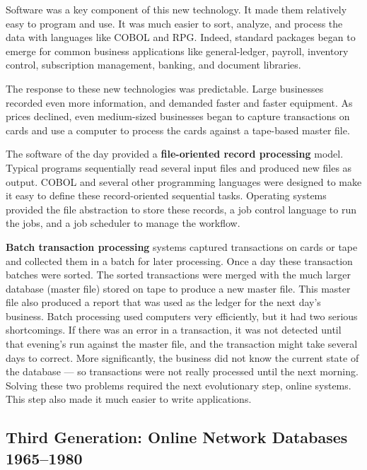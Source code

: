 \documentclass[a4paper,12pt,notitlepage,twoside,openright]{article}
\begin{document}
Software was a key component of this new technology. It made them
relatively easy to program and use. It was much easier to sort, analyze,
and process the data with languages like COBOL and RPG. Indeed, standard
packages began to emerge for common business applications like
general-ledger, payroll, inventory control, subscription management,
banking, and document libraries.

The response to these new technologies was predictable. Large businesses
recorded even more information, and demanded faster and faster
equipment. As prices declined, even medium-sized businesses began to
capture transactions on cards and use a computer to process the cards
against a tape-based master file.

The software of the day provided a \textbf{file-oriented record
processing} model. Typical programs sequentially read several input
files and produced new files as output. COBOL and several other
programming languages were designed to make it easy to define these
record-oriented sequential tasks. Operating systems provided the file
abstraction to store these records, a job control language to run the
jobs, and a job scheduler to manage the workflow.

\textbf{Batch transaction processing} systems captured transactions on
cards or tape and collected them in a batch for later processing. Once a
day these transaction batches were sorted. The sorted transactions were
merged with the much larger database (master file) stored on tape to
produce a new master file. This master file also produced a report that
was used as the ledger for the next day's business. Batch processing
used computers very efficiently, but it had two serious shortcomings. If
there was an error in a transaction, it was not detected until that
evening's run against the master file, and the transaction might take
several days to correct. More significantly, the business did not know
the current state of the database --- so transactions were not really
processed until the next morning. Solving these two problems required
the next evolutionary step, online systems. This step also made it much
easier to write applications.

\hypertarget{third-generation-online-network-databases-1965--1980}{%
\subsection{Third Generation: Online Network Databases
1965--1980}\label{third-generation-online-network-databases-1965-1980}}
\end{document}
